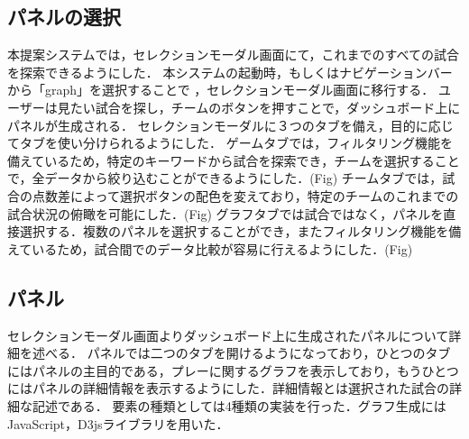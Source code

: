 \documentclass[sotsuron]{kuee}
\begin{document}
		\subsection{パネルの選択}
			本提案システムでは，セレクションモーダル画面にて，これまでのすべての試合を探索できるようにした．
			本システムの起動時，もしくはナビゲーションバーから「graph」を選択することで	，セレクションモーダル画面に移行する．
			ユーザーは見たい試合を探し，チームのボタンを押すことで，ダッシュボード上にパネルが生成される．
			セレクションモーダルに３つのタブを備え，目的に応じてタブを使い分けられるようにした．
			ゲームタブでは，フィルタリング機能を備えているため，特定のキーワードから試合を探索でき，チームを選択することで，全データから絞り込むことができるようにした．(Fig)
			チームタブでは，試合の点数差によって選択ボタンの配色を変えており，特定のチームのこれまでの試合状況の俯瞰を可能にした．(Fig)
			グラフタブでは試合ではなく，パネルを直接選択する．複数のパネルを選択することができ，またフィルタリング機能を備えているため，試合間でのデータ比較が容易に行えるようにした．(Fig)
		\subsection{パネル}
			セレクションモーダル画面よりダッシュボード上に生成されたパネルについて詳細を述べる．
			パネルでは二つのタブを開けるようになっており，ひとつのタブにはパネルの主目的である，プレーに関するグラフを表示しており，もうひとつにはパネルの詳細情報を表示するようにした．詳細情報とは選択された試合の詳細な記述である．
			要素の種類としては4種類の実装を行った．グラフ生成にはJavaScript，D3jsライブラリを用いた．
\end{document}
